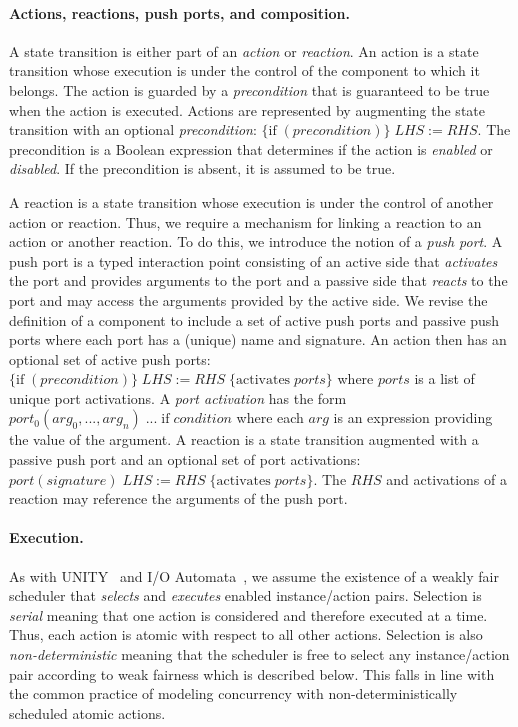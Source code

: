 \paragraph{Actions, reactions, push ports, and composition.}
A state transition is either part of an \emph{action} or \emph{reaction}.
An action is a state transition whose execution is under the control of the component to which it belongs.
The action is guarded by a \emph{precondition} that is guaranteed to be true when the action is executed.
Actions are represented by augmenting the state transition with an optional \emph{precondition}: $\{ \mathrm{if} \; (precondition) \} \; LHS := RHS$.
The precondition is a Boolean expression that determines if the action is \emph{enabled} or \emph{disabled}.
If the precondition is absent, it is assumed to be true.

A reaction is a state transition whose execution is under the control of another action or reaction.
Thus, we require a mechanism for linking a reaction to an action or another reaction.
To do this, we introduce the notion of a \emph{push port}.
A push port is a typed interaction point consisting of an active side that \emph{activates} the port and provides arguments to the port and a passive side that \emph{reacts} to the port and may access the arguments provided by the active side.
We revise the definition of a component to include a set of active push ports and passive push ports where each port has a (unique) name and signature.
An action then has an optional set of active push ports: $\{ \mathrm{if} \; (precondition) \} \; LHS := RHS \; \{\mathrm{activates} \; ports \}$ where $ports$ is a list of unique port activations.
A \emph{port activation} has the form $port_0(arg_0, ..., arg_n) \; ... \; \mathrm{if} \; condition$ where each $arg$ is an expression providing the value of the argument.
A reaction is a state transition augmented with a passive push port and an optional set of port activations: $port(signature) \; LHS := RHS \; \{ \mathrm{activates } \; ports \}$.
The $RHS$ and activations of a reaction may reference the arguments of the push port.

\paragraph{Execution.}
As with UNITY~\cite{chandy1989parallel} and I/O Automata~\cite{nancy1996distributed}, we assume the existence of a weakly fair scheduler that \emph{selects} and \emph{executes} enabled instance/action pairs.
Selection is \emph{serial} meaning that one action is considered and therefore executed at a time.
Thus, each action is atomic with respect to all other actions.
Selection is also \emph{non-deterministic} meaning that the scheduler is free to select any instance/action pair according to weak fairness which is described below.
This falls in line with the common practice of modeling concurrency with non-deterministically scheduled atomic actions.

